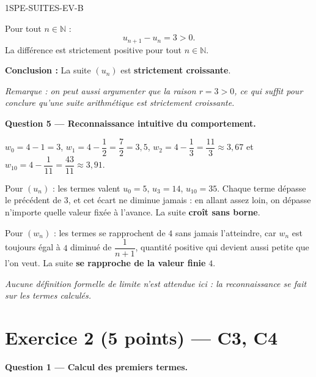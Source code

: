 \begin{corrige}{1SPE-SUITES-EV-B}

Pour tout $n \in \mathbb{N}$ :
\[
  u_{n+1} - u_n = 3 > 0.
\]
La différence est strictement positive pour tout $n \in \mathbb{N}$.

\textbf{Conclusion :} La suite $(u_n)$ est \textbf{strictement croissante}.

\textit{Remarque : on peut aussi argumenter que la raison $r = 3 > 0$, ce qui suffit pour conclure qu'une suite arithmétique est strictement croissante.}


\medskip
\textbf{Question 5 — Reconnaissance intuitive du comportement.}

$w_0 = 4 - 1 = 3$, $w_1 = 4 - \dfrac{1}{2} = \dfrac{7}{2} = 3{,}5$, $w_2 = 4 - \dfrac{1}{3} = \dfrac{11}{3} \approx 3{,}67$ et $w_{10} = 4 - \dfrac{1}{11} = \dfrac{43}{11} \approx 3{,}91$.

Pour $(u_n)$ : les termes valent $u_0 = 5$, $u_3 = 14$, $u_{10} = 35$. Chaque terme dépasse le précédent de $3$, et cet écart ne diminue jamais : en allant assez loin, on dépasse n'importe quelle valeur fixée à l'avance. La suite \textbf{croît sans borne}.

Pour $(w_n)$ : les termes se rapprochent de $4$ sans jamais l'atteindre, car $w_n$ est toujours égal à $4$ diminué de $\dfrac{1}{n+1}$, quantité positive qui devient aussi petite que l'on veut. La suite \textbf{se rapproche de la valeur finie } $4$.


\textit{Aucune définition formelle de limite n'est attendue ici : la reconnaissance se fait sur les termes calculés.}

\section*{Exercice 2 \hfill (5 points) — C3, C4}


\bigskip
\textbf{Question 1 — Calcul des premiers termes.}


\end{corrige}
